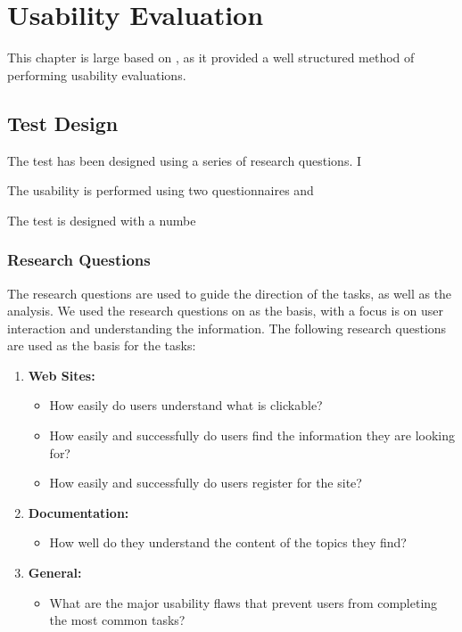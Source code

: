 \chapter{Usability Evaluation}\label{cha:usability}

This chapter is large based on \citep[p. 27-38, 65-91 and 269-275]{UXBook}, as
it provided a well structured method of performing usability evaluations.

\section{Test Design}\label{sec:UXTD}
The test has been designed using a series of research questions. I



The usability is performed using two questionnaires and 

The test is designed with a numbe 





\subsection{Research Questions}\label{subsec:UXRQ}
The research questions are used to guide the direction of the tasks, as well as
the analysis. We used the research questions on \citep[p. 70-71]{UXBook} as the
basis, with a focus is on user interaction and understanding the information.
The following research questions are used as the basis for the tasks:

\begin{enumerate}
  \item \textbf{Web Sites:} 
	\begin{itemize}
      \item How easily do users understand what is clickable?
      \item How easily and successfully do users find the information they are
      looking for?
      \item How easily and successfully do users register for the site?
    \end{itemize}
  \item \textbf{Documentation:}
    \begin{itemize}
      \item How well do they understand the content of the topics they find?
    \end{itemize}
  \item \textbf{General:}
    \begin{itemize}
      \item What are the major usability flaws that prevent users from
      completing the most common tasks?
    \end{itemize}
\end{enumerate}

